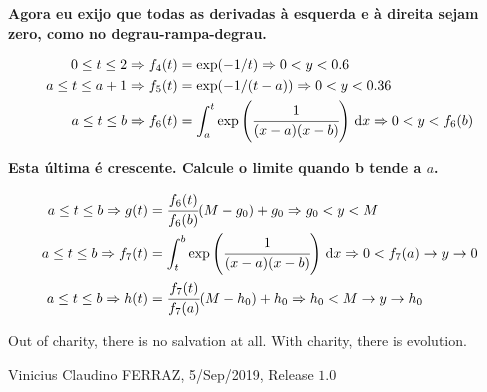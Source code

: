 \documentclass[12pt]{article}
\begin{document}
\textbf{Agora eu exijo que todas as derivadas \`a esquerda e \`a direita sejam zero, como no degrau-rampa-degrau.}

\begin{align}
  0 \le t \le 2 \Rightarrow f_4(t) &= \exp(-1/t) \Rightarrow 0 < y < 0.6 \\
  a \le t \le a + 1 \Rightarrow f_5(t) &= \exp(-1/(t - a)) \Rightarrow 0 < y < 0.36 \\
  a \le t \le b \Rightarrow f_6(t) &= \int_a^t \exp\left(\cfrac{1}{(x - a) (x - b)}\right)\,\mathrm{d}x \Rightarrow 0 < y < f_6(b)
\end{align}

\textbf{Esta \'ultima \'e crescente. Calcule o limite quando b tende a $a$.}

\begin{align}
  a \le t \le b \Rightarrow g(t) &= \cfrac{f_6(t)}{f_6(b)} (M - g_0) + g_0 \Rightarrow g_0 < y < M \\
  a \le t \le b \Rightarrow f_7(t) &= \int_t^b \exp\left(\cfrac{1}{(x - a) (x - b)}\right)\,\mathrm{d}x \Rightarrow 0 < f_7(a) \to y \to 0 \\
  a \le t \le b \Rightarrow h(t) &= \cfrac{f_7(t)}{f_7(a)} (M - h_0) + h_0 \Rightarrow h_0 < M \to y \to h_0
\end{align}

\vspace{3mm}

Out of charity, there is no salvation at all. With charity, there is evolution.

\vspace{3mm}

Vinicius Claudino FERRAZ, 5/Sep/2019, Release $1.0$
\end{document}
